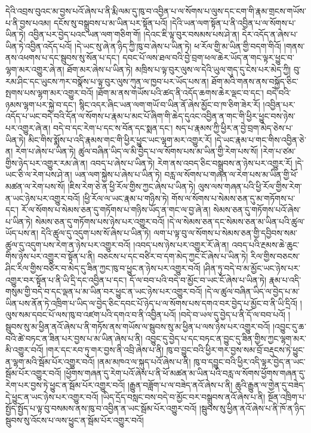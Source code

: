 དེའི་འབྲས་བུའང་མ་བྱས་པའོ་ཞེས་པ་ནི་རྨི་ལམ་དུ་ཁུ་བ་འབྱིན་པ་ལ་སོགས་པ་ལུས་དང་ངག་གི་རྣམ་གྲངས་གཡོས་པ་ནི་བྱས་པའམ། དངོས་སུ་བསྒྲུབས་པ་མ་ཡིན་པར་སྟོན་པའོ། །དེའི་ཡན་ལག་སྟོན་པ་ནི་འབྱིན་པ་ལ་སོགས་པ་ཡིན་ཏེ། འབྱིན་པར་བྱེད་པའང་ཡན་ལག་གཅིག་གོ། །དེའང་ཇི་ལྟ་བུར་བསམས་པས་ཤེ་ན། དེར་འདོད་ན་ཞེས་པ་ཡིན་ཏེ་འབྱིན་འདོད་པའོ། །དེ་ཡང་སུ་ཞེ་ན་ཉིད་ཀྱི་ཁུ་བ་ཞེས་པ་ཡིན་ཏེ། ཕ་རོལ་གྱི་མ་ཡིན་གྱི་བདག་གིའོ། །གནས་ནས་འཕགས་པ་དང་སྦུབས་སུ་སོན་པ་དང་། དབང་པོ་ལས་ཐལ་བའི་བྱེ་བྲག་ཕལ་ཆེར་ཡོད་ན་གང་ལྟར་ཕྱུང་བ་ལྷག་མར་འགྱུར་ཞེ་ན། ཐོག་མར་ཞེས་པ་ཡིན་ཏེ། མཁྲིས་པ་ལྟ་བུར་ལུས་ལ་དེའི་ཡུལ་གུད་དུ་ངེས་པར་མེད་ཀྱི། བུ་རམ་ཤིང་དང་ཡུངས་ཀར་བསྣོས་པ་ལྟ་བུར་ལུས་ཀུན་ལ་ཁྱབ་པར་ཡོད་པས་ན། ཐོག་མའི་གནས་ནས་བསྐྱོད་ཅིང་སྤགས་པས་ལྷག་མར་འགྱུར་བའོ། །ཐོག་མ་ནས་གཡོས་པའི་ཚད་ནི་འདོད་ཆགས་ཆེར་ལྡང་བ་དང་། བདེ་བའི་ཉམས་ལྷག་པར་སྐྱེ་བ་དང་། སྙིང་འདར་ཞིང་ཡན་ལག་གཡོ་བ་ཡིན་ནོ་ཞེས་མྱོང་བ་ཁ་ཅིག་ཟེར་རོ། །འབྱིན་པར་འདོད་པ་ཡང་བདེ་བའི་དོན་ལ་སོགས་པ་རྣམ་པ་མང་པོ་ཞིག་གི་ཆེད་དུའང་འབྱིན་ན་གང་གི་ཕྱིར་ཕྱུང་བས་ཉེས་པར་འགྱུར་ཞེ་ན། བདེ་བ་དང་རེག་པ་དང་ས་བོན་དང་སྨན་དང་། སད་པ་རྣམས་ཀྱི་ཕྱིར་ན་བྱེ་བྲག་མེད་ཅེས་པ་ཡིན་ཏེ། མིང་གིས་སྨོས་པ་འདི་རྣམས་གང་གི་ཕྱིར་ཕྱུང་ཡང་ལྷག་མར་འགྱུར་རོ། །དེ་ཡང་རྣམ་པ་གང་གིས་འབྱིན་ཅེ་ན། རེག་པ་ཞེས་པ་ཡིན་ཏེ། ཚུལ་བཞིན་ཡིད་ལ་མི་བྱེད་པ་ལ་སོགས་པས་མ་ཡིན་གྱི་རེག་པས་སོ། །རེག་པ་ཙམ་གྱིས་ཉེད་པར་འགྱུར་རམ་ཞེ་ན། འབད་པ་ཞེས་པ་ཡིན་ཏེ། རེག་ནས་འབད་ཅིང་བསྒྲུབས་ན་ཉེས་པར་འགྱུར་རོ། །དེ་ཡང་ཅི་ལ་རེག་པས་ཤེ་ན། ཡན་ལག་སྐྱེས་པ་ཞེས་པ་ཡིན་ཏེ། བརླ་ལ་སོགས་པ་གཞན་ལ་རེག་པས་མ་ཡིན་གྱི་ཕོ་མཚན་ལ་རེག་པས་སོ། །ཇིས་རེག་ཅེ་ན་ཕྱི་རོལ་གྱིས་ཀྱང་ཞེས་པ་ཡིན་ཏེ། ལུས་ལས་གཞན་པའི་ཕྱི་རོལ་གྱིས་རེག་ན་ཡང་ཉེས་པར་འགྱུར་བའོ། །ཕྱི་རོལ་ལ་ཡང་རྣམ་པ་གཉིས་ཏེ། གོས་ལ་སོགས་པ་སེམས་ཅན་དུ་མ་གཏོགས་པ་དང་། རོ་ལ་སོགས་པ་སེམས་ཅན་དུ་གཏོགས་པ་གཉིས་ཡོད་ན་གང་ལ་བྱ་ཞེ་ན། སེམས་ཅན་དུ་གཏོགས་པའོ་ཞེས་པ་ཡིན་ཏེ། སེམས་ཅན་དུ་གཏོགས་པས་ཉེས་པར་འགྱུར་བའོ། །དེ་ལ་སེམས་ཅན་དང་སེམས་ཅན་མ་ཡིན་པའི་ཚུལ་ཡོད་པས་ན། དེའི་ཚུལ་དུ་འདུག་པས་སོ་ཞེས་པ་ཡིན་ཏེ། ལག་པ་ལྟ་བུ་ལ་སོགས་པ་སེམས་ཅན་གྱི་དབྱིབས་སམ་ཚུལ་དུ་འདུག་པས་རེག་ན་ཉེས་པར་འགྱུར་བའོ། །འབད་པས་ཉེས་པར་འགྱུར་རོ་ཞེ་ན། འབད་པའི་རྔམས་ཆེ་ཆུང་གིས་ཉེས་པར་འགྱུར་བ་སྟོན་པ་ནི། བཅངས་པ་དང་བཙིར་བ་དག་མེད་ཀྱང་ངོ་ཞེས་པ་ཡིན་ཏེ། རིལ་གྱིས་བཅངས་ཤིང་རིལ་གྱིས་བཙིར་བ་མེད་དུ་ཟིན་ཀྱང་ཁུ་བ་ཕྱུང་ན་ཉེས་པར་འགྱུར་བའོ། །ཤིན་ཏུ་བདེ་བ་མ་མྱོང་ཡང་ཉེས་པར་འགྱུར་བར་སྟོན་པ་ནི་ཡི་དྲི་དང་འབྱིན་པ་དང་། དོ་ལ་བབ་པའི་བདེ་བ་མྱོང་བ་ཡང་ངོ་ཞེས་པ་ཡིན་ཏེ། རྣམ་པ་འདི་གསུམ་གྱི་བདེ་བ་དང་ལྡན་པ་མ་ཡིན་བར་ཕྱུང་ན་ཡང་ཉེས་པར་འགྱུར་བའོ། །དེ་ལ་ཚུལ་བཞིན་ཡིད་ལ་བྱེད་པ་མ་ཡིན་པས་ནོན་ཏེ་འཁྲིག་པ་ཡིད་ལ་བྱེད་ཅིང་དབང་པོ་ཉེད་པ་ལ་སོགས་པས་དགའ་བར་བྱེད་པ་མྱོང་བ་ནི་ཡི་དྲིའོ། །ལུས་སམ་དབང་པོ་ལས་ཁུ་བ་འཛག་པའི་དགའ་བ་ནི་འབྱིན་པའོ། །བདེ་བ་ཡལ་དུ་བྱེད་པ་ནི་དོ་ལ་བབ་པའོ། །སྦུབས་སུ་མ་ཕྱིན་ནའོ་ཞེས་པ་ནི་གཏོས་ནས་གཡོས་ལ་སྦུབས་སུ་མ་ཕྱིན་པ་ལས་ཉེས་པར་འགྱུར་བའོ། །འབྱུང་དུ་ཆ་བའི་ཚེ་བཏང་ན་ཟིན་པར་བྱས་པ་མ་ཡིན་ཞེས་པ་ནི། འབྱུང་དུ་བྱེད་པ་དང་བཏང་ན་བྱུང་དུ་ཟིན་གྱིས་ཀྱང་ལྷག་མར་མི་འགྱུར་བའོ། །གར་དང་རབ་ཏུ་གར་བྱས་ནི་འབྲི་ཞེས་པ་ནི། ཁུ་བ་བྱུང་བའི་ཕྱིར་གར་བྱས་སམ་བྲོ་བརྡུངས་ཏེ་ཕྱུང་ན་ལྷག་མའི་སྦོམ་པོར་འགྱུར་བའོ། །ནམ་མཁའ་ལ་སྐུད་པའོ་ཞེས་པ་ནི། ཁུ་བ་དབྱུང་བའི་ཕྱིར་འདི་ལྟར་བྱེད་ན་ཡང་སྦོམ་པོར་འགྱུར་བའོ། །ཕྱོགས་གཞན་དུ་རེག་པའོ་ཞེས་པ་ནི་ཕོ་མཚན་མ་ཡིན་པའི་བརླ་ལ་སོགས་ཕྱོགས་གཞན་དུ་རེག་པར་བྱས་ཏེ་ཕྱུང་ན་སྦོམ་པོར་འགྱུར་བའོ། །རྒྱུན་བཟློག་པ་ལ་བཟེད་ནའོ་ཞེས་པ་ནི། ཆུའི་རྒྱུན་ལ་གྱེན་དུ་བཟེད་དེ་ཕྱུང་ན་ཡང་ཉེས་པར་འགྱུར་བའོ། །ཡིད་དྲོད་བསླང་བས་བདེ་བ་མྱོང་བར་བསྒྲུབས་ནའོ་ཞེས་པ་ནི། སྔོན་འཁྲིག་པ་སྤྱོད་སྤྱོད་པ་ལྟ་བུ་བསམས་ནས་ཁུ་བ་འབྱིན་ན་ཡང་སྦོམ་པོར་འགྱུར་བའོ། །སྦུབས་སུ་ཕྱིན་ནའོ་ཞེས་པ་ནི་ཁོ་ན་ཉིད་སྦུབས་སུ་འོངས་པ་ལས་ཕྱུང་ན་སྦོམ་པོར་འགྱུར་བའོ། 